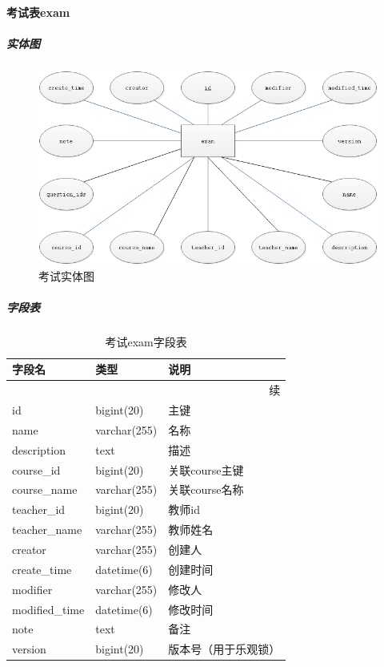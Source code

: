 \documentclass[titlepage,UTF8,linespread=1.5]{ctexart}
\begin{document}
\paragraph{考试表exam}
\subparagraph{实体图}
\begin{figure}[H]
    \centering
    \includegraphics[width=140mm]{entity-exam.png}
    \caption{考试实体图}
    \label{fig:entity-exam}
\end{figure}
\subparagraph{字段表}
\begin{longtable}{|p{10em}|p{6em}|p{15em}|}
    \caption{考试exam字段表}\label{tab:table_exam}       \\\hline
    字段名         & 类型         & 说明                 \\\hline
    \endfirsthead
    \multicolumn{3}{r}{{续\tablename\thetable{}}}        \\\hline
    \endhead
    id             & bigint(20)   & 主键                 \\\hline
    name           & varchar(255) & 名称                 \\\hline
    description    & text         & 描述                 \\\hline
    course\_id     & bigint(20)   & 关联course主键       \\\hline
    course\_name   & varchar(255) & 关联course名称       \\\hline
    teacher\_id    & bigint(20)   & 教师id               \\\hline
    teacher\_name  & varchar(255) & 教师姓名             \\\hline
    creator        & varchar(255) & 创建人               \\\hline
    create\_time   & datetime(6)  & 创建时间             \\\hline
    modifier       & varchar(255) & 修改人               \\\hline
    modified\_time & datetime(6)  & 修改时间             \\\hline
    note           & text         & 备注                 \\\hline
    version        & bigint(20)   & 版本号（用于乐观锁） \\\hline
\end{longtable}\par
\end{document}
